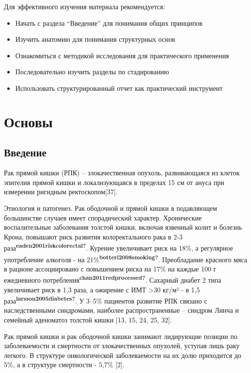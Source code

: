 \documentclass[
  russian,
  12pt,
  a4paper,
]{report}
\providecommand{\tightlist}{%
  \setlength{\itemsep}{0pt}\setlength{\parskip}{0pt}}
\begin{document}

Для эффективного изучения материала рекомендуется:

\begin{itemize}
\tightlist
\item
  Начать с раздела ``Введение'' для понимания общих принципов
\item
  Изучить анатомию для понимания структурных основ
\item
  Ознакомиться с методикой исследования для практического применения
\item
  Последовательно изучить разделы по стадированию
\item
  Использовать структурированный отчет как практический инструмент
\end{itemize}

\part{Основы}

\chapter{Введение}\label{ux432ux432ux435ux434ux435ux43dux438ux435}

Рак прямой кишки (РПК) -- злокачественная опухоль, развивающаяся из
клеток эпителия прямой кишки и локализующаяся в пределах 15 см от ануса
при измерении ригидным ректоскопом{[}37{]}.

Этиология и патогенез. Рак ободочной и прямой кишки в подавляющем
большинстве случаев имеет спорадический характер. Хронические
воспалительные заболевания толстой кишки, включая язвенный колит и
болезнь Крона, повышают риск развития колоректального рака в 2-3
раза\textsuperscript{\textbf{eaden2001riskcolorectal?}}. Курение
увеличивает риск на 18\%, а регулярное употребление алкоголя - на
21\%\textsuperscript{\textbf{botteri2008smoking?}}. Преобладание
красного мяса в рационе ассоциировано с повышением риска на 17\% на
каждые 100 г ежедневного
потребления\textsuperscript{\textbf{chan2011redprocessed?}}. Сахарный
диабет 2 типа увеличивает риск в 1,3 раза, а ожирение с ИМТ
\textgreater30 кг/м² - в 1,5
раза\textsuperscript{\textbf{larsson2005diabetes?}}. У 3--5\% пациентов
развитие РПК связано с наследственными синдромами, наиболее
распространенные -- синдром Линча и семейный аденоматоз толстой кишки
{[}13, 15, 24, 25, 32{]}.

Рак прямой кишки и рак ободочной кишки занимают лидирующие позиции по
заболеваемости и смертности от злокачественных опухолей, уступая лишь
раку легкого. В структуре онкологической заболеваемости на их долю
приходится до 5\%, а в структуре смертности - 5,7\% {[}2{]}.
\end{document}
